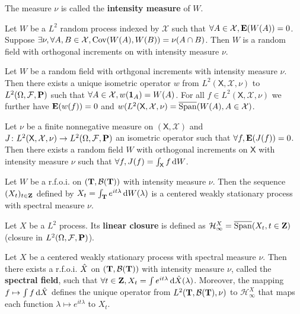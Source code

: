 	The measure $\nu$ is called the \textbf{intensity measure} of $W$.

	\begin{lem}
		Let $W$ be a $L^2$ random process indexed by $\mathcal{X}$ such that $\forall A \in \mathcal{X}, \mathbf{E}(W(A)) = 0$.
		Suppose $\exists \nu, \forall A,B \in \mathcal{X}, \operatorname{Cov}(W(A),W(B)) = \nu(A \cap B)$.
		Then $W$ is a random field with orthogonal increments on with intensity measure $\nu$.
	\end{lem}

	\begin{thm}
		Let $W$ be a random field with orthgonal increments with intensity measure $\nu$.
		Then there exists a unique isometric operator $w$ from $L^2(\mathsf{X},\mathcal{X},\nu)$ to $L^2(\Omega,\mathcal{F},\mathbf{P})$ such that $\forall A \in \mathcal{X}, w(\operatorname{\mathbf{1}}_A) = W(A)$.
		For all $f \in L^2(\mathsf{X},\mathcal{X},\nu)$ we further have $\mathbf{E}(w(f)) = 0$ and $w(L^2(\mathsf{X},\mathcal{X},\nu) = \overline{\operatorname{Span}}(W(A), A \in \mathcal{X})$.
	\end{thm}

	\begin{thm}
		Let $\nu$ be a finite nonnegative measure on $(\mathsf{X},\mathcal{X})$ and $J \colon L^2(\mathsf{X},\mathcal{X},\nu) \to L^2(\Omega,\mathcal{F},\mathbf{P})$ an isometric operator such that $\forall f, \mathbf{E}(J(f)) = 0$.
		Then there exists a random field $W$ with orthogonal increments on $\mathsf{X}$ with intensity measure $\nu$ such that $\forall f, J(f) = \int_{\mathsf{X}} f \mathop{}\mathopen{}\mathrm{d} W$.
	\end{thm}

	\begin{pop}
		Let $W$ be a r.f.o.i. on $(\mathbf{T},\mathcal{B}(\mathbf{T}))$ with intensity measure $\nu$.
		Then the sequence $(X_t)_{t \in \mathbf{Z}}$ defined by $X_t = \int_{\mathbf{T}} e^{it \lambda} \mathop{}\mathopen{}\mathrm{d} W(\lambda)$ is a centered weakly stationary process with spectral measure $\nu$.
	\end{pop}

	\begin{defn}
		Let $X$ be a $L^2$ process.
		Its \textbf{linear closure} is defined as $\mathcal{H}_{\infty}^X = \overline{\operatorname{Span}}(X_t, t \in \mathbf{Z})$ (closure in $L^2(\Omega,\mathcal{F},\mathbf{P})$).
	\end{defn}

	\begin{thm}
		Let $X$ be a centered weakly stationary process with spectral measure $\nu$.
		Then there exists a r.f.o.i. $\Hat{X}$ on $(\mathbf{T},\mathcal{B}(\mathbf{T}))$ with intensity measure $\nu$, called the \textbf{spectral field}, such that $\forall t \in \mathbf{Z}, X_t = \int e^{it \lambda} \mathop{}\mathopen{}\mathrm{d} \Hat{X}(\lambda)$.
		Moreover, the mapping $f \mapsto \int f \mathop{}\mathopen{}\mathrm{d} \Hat{X}$ defines the unique operator from $L^2(\mathbf{T},\mathcal{B}(\mathbf{T}),\nu)$ to $\mathcal{H}_{\infty}^X$ that maps each function $\lambda \mapsto e^{it \lambda}$ to $X_t$.
	\end{thm}


